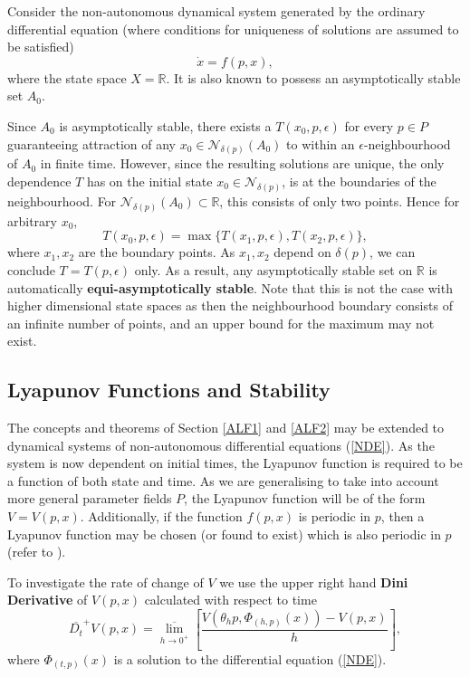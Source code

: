 \begin{eg}
Consider the non-autonomous dynamical system generated by the ordinary
differential equation (where conditions for uniqueness of solutions are
assumed to be satisfied)
\[ \dot{x} = f(p,x), \]
where the state space $X=\mathbb{R}$. It is also known to possess an
asymptotically stable set $A_0$.

Since $A_0$ is asymptotically stable, there exists a $T(x_0,p,\epsilon)$ for
every $p \in P$ guaranteeing attraction of any $x_0 \in
\mathcal{N}_{\delta(p)}(A_0)$ to within an $\epsilon$-neighbourhood of
$A_0$ in finite time. However, since the resulting solutions are
unique, the only dependence $T$ has on the initial state $x_0 \in
\mathcal{N}_{\delta(p)}$, is at the boundaries of the
neighbourhood. For $\mathcal{N}_{\delta(p)}(A_0) \subset \mathbb{R}$,
this consists of only two points. Hence for arbitrary $x_0$,
\[ T(x_0,p,\epsilon) = \max \{T(x_1,p,\epsilon),T(x_2,p,\epsilon)\}, \]
where $x_1,x_2$ are the boundary points. As $x_1,x_2$ depend on
$\delta(p)$, we can conclude $T = T(p, \epsilon)$ only. As a result, any
asymptotically stable set on $\mathbb{R}$ is automatically {\bf
equi-asymptotically stable}. Note that this is not the case with higher
dimensional state spaces as then the neighbourhood boundary consists of an
infinite number of points, and an upper bound for the maximum may not exist.
\end{eg}

\subsection{Lyapunov Functions and Stability}
\label{NLFsec}

The concepts and theorems of Section \ref{ALF1} and \ref{ALF2} may
be extended to dynamical systems of non-autonomous differential
equations (\ref{NDE}). As the system is now dependent on initial
times, the Lyapunov function is required to be a function of both
state and time. As we are generalising to take into account more general parameter 
fields $P$, the Lyapunov function will be of the form $V=V(p,x)$. Additionally, if the function $f(p,x)$ is periodic in $p$, then a Lyapunov function may be
chosen (or found to exist) which is also periodic in $p$ (refer to
\cite{RoHaLa77}).

To investigate the rate of change of $V$ we use the upper right hand \textbf{Dini Derivative} of $V(p,x)$ calculated with respect to time
\[ \overline{D_t}^{+} V(p,x) = \overline{\lim_{h\to 0^+}} \left[
    \frac{V( \theta_h p, \Phi_{(h, p)}(x)) - V(p,x)}{h} \right], \]
where $\Phi_{(t, p)}(x)$ is a solution to the differential equation (\ref{NDE}).

